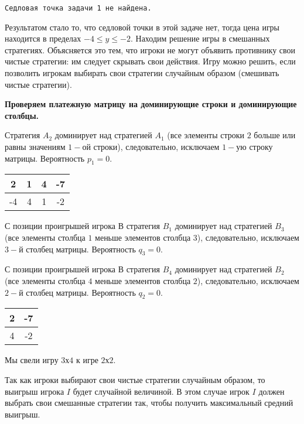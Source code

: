 \documentclass[11pt]{article}
\begin{document}
    \begin{Verbatim}[commandchars=\\\{\}]
Седловая точка задачи 1 не найдена.
    \end{Verbatim}

    Результатом стало то, что седловой точки в этой задаче нет, тогда цена игры находится в пределах $-4 \leq y \leq -2$. Находим решение игры в смешанных стратегиях. Объясняется это тем, что игроки не могут объявить противнику свои чистые стратегии: им следует скрывать свои действия. Игру можно решить, если позволить игрокам выбирать свои стратегии случайным образом (смешивать чистые стратегии).

    \textbf{Проверяем платежную матрицу на доминирующие строки и доминирующие столбцы.}

Стратегия $A_2$ доминирует над стратегией $A_1$ (все элементы строки $2$ больше или равны значениям $1-$ой строки), следовательно, исключаем $1-$ую строку матрицы. Вероятность $p_1 = 0.$

\begin{table}[h]
    \centering
    \begin{tabular}{c|c|c|c}
         2& 1 & 4 & -7 \\
         \hline
         -4 & 4 & 1 & -2\\ 
    \end{tabular}
\end{table}

С позиции проигрышей игрока В стратегия $B_1$ доминирует над стратегией $B_3$ (все элементы столбца $1$ меньше элементов столбца $3$), следовательно, исключаем $3-$й столбец матрицы. Вероятность $q_3 = 0$.

С позиции проигрышей игрока В стратегия $B_4$ доминирует над стратегией $B_2$ (все элементы столбца $4$ меньше элементов столбца $2$), следовательно, исключаем $2-$й столбец матрицы. Вероятность $q_2 = 0$.

\begin{table}[h]
    \centering
    \begin{tabular}{c|c}
        2 & -7 \\
        \hline
        4 & -2
    \end{tabular}
\end{table}

Мы свели игру $3 \text{х} 4$ к игре $2 \text{х} 2$.

Так как игроки выбирают свои чистые стратегии случайным образом, то выигрыш игрока $I$ будет случайной величиной. В этом случае игрок $I$ должен выбрать свои смешанные стратегии так, чтобы получить максимальный средний выигрыш.
\end{document}
